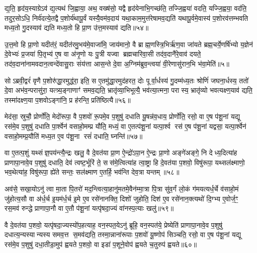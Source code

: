 द्य॒ति॒ हृद॑य॒स्याग्रेऽव॑ द्य॒त्यथ॑ जि॒ह्वाया॒ अथ॒ वख्ष॑सो॒ यद्वै हृद॑येनाभि॒गच्छ॑ति॒ तज्जि॒ह्वया॑ वदति॒ यज्जि॒ह्वया॒ वद॑ति॒ तदुर॒सोऽधि॒ निर्व॑दत्ये॒तद्वै प॒शोर्य॑थापू॒र्वं यस्यै॒वम॑व॒दाय॑ यथा॒काम॒मुत्त॑रेषामव॒द्यति॑ यथापू॒र्वमे॒वास्य॑ प॒शोरव॑त्तम्भवति मध्य॒तो गु॒दस्याव॑ द्यति मध्य॒तो हि प्रा॒ण उ॑त्त॒मस्याव॑ द्यति॥५४॥

उ॒त्त॒मो हि प्रा॒णो यदीत॑रं॒ यदीत॑रमु॒भय॑मे॒वाजा॑मि॒ जाय॑मानो॒ वै ब्राह्म॒णस्त्रि॒भिर्\mbox{}ऋ॑ण॒वा जा॑यते ब्रह्म॒चर्ये॒णर्\mbox{}षि॑भ्यो य॒ज्ञेन॑ दे॒वेभ्यः॑ प्र॒जया॑ पि॒तृभ्य॑ ए॒ष वा अ॑नृ॒णो यः पु॒त्री यज्वा ब्रह्मचारिवा॒सी तद॑व॒दानै॑रे॒वाव॑ दयते॒ तद॑व॒दाना॑नामवदान॒त्वन्दे॑वासु॒राः संय॑त्ता आस॒न्ते दे॒वा अ॒ग्निम॑ब्रुव॒न्त्वया॑ वी॒रेणासु॑रान॒भि भ॑वा॒मेति॑॥५॥

सोऽब्रवी॒द्वरं॑ वृणै प॒शोरु॑द्धा॒रमुद्ध॑रा॒ इति॒ स ए॒तमु॑द्धा॒रमुद॑हरत॒ दोः पूर्वा॒र्धस्य॑ गु॒दम्म॑ध्य॒तः श्रोणिं॑ जघना॒र्धस्य॒ ततो॑ दे॒वा अभ॑व॒न्परासु॑रा॒ यत्त्र्य॒ङ्गाणाꣳ॑ समव॒द्यति॒ भ्रातृ॑व्या॒भिभूत्यै॒ भव॑त्या॒त्मना॒ परास्य॒ भ्रातृ॑व्यो भवत्यक्ष्ण॒याव॑ द्यति॒ तस्मा॑दक्ष्ण॒या प॒शवोऽङ्गा॑नि॒ प्र ह॑रन्ति॒ प्रति॑ष्ठित्यै॥५६॥

{\anuvakamend[{ए॒तौ प॑शू॒ना समे॑धस्यै॒व तस्यावोत्त॒मस्याव॑ द्य॒तीति॒ पञ्च॑चत्वारिशच्च॥10॥}]}

मेद॑सा॒ स्रुचौ॒ प्रोर्णो॑ति॒ मेदो॑रूपा॒ वै प॒शवो॑ रू॒पमे॒व प॒शुषु॑ दधाति यू॒षन्न॑व॒धाय॒ प्रोर्णो॑ति॒ रसो॒ वा ए॒ष प॑शू॒नां यद्यू रस॑मे॒व प॒शुषु॑ दधाति पा॒र्श्वेन॑ वसाहो॒मम्प्र यौ॑ति॒ मध्यं॒ वा ए॒तत्प॑शू॒नां यत्पा॒र्श्व रस॑ ए॒ष प॑शू॒नां यद्वसा॒ यत्पा॒र्श्वेन॑ वसाहो॒मम्प्र॒यौति॑ मध्य॒त ए॒व प॑शू॒ना रसं॑ दधाति॒ घ्नन्ति॑॥५७॥

वा ए॒तत्प॒शुं यथ्संज्ञ॒पय॑न्त्यै॒न्द्रः खलु॒ वै दे॒वत॑या प्रा॒ण ऐ॒न्द्रो॑ऽपा॒न ऐ॒न्द्रः प्रा॒णो अङ्गे॑अङ्गे॒ नि देध्य॒दित्या॑ह प्राणापा॒नावे॒व प॒शुषु॑ दधाति॒ देव॑ त्वष्ट॒र्भूरि॑ ते॒ सस॑मे॒त्वित्या॑ह त्वा॒ष्ट्रा हि दे॒वत॑या प॒शवो॒ विषु॑रूपा॒ यथ्सल॑क्ष्माणो॒ भव॒थेत्या॑ह॒ विषु॑रूपा॒ ह्ये॑ते सन्तः॒ सल॑क्ष्माण ए॒तर्\mbox{}हि॒ भव॑न्ति देव॒त्रा यन्तम्॥५८॥

अव॑से॒ सखा॒योऽनु॑ त्वा मा॒ता पि॒तरो॑ मद॒न्त्वित्या॒हानु॑मतमे॒वैन॑म्मा॒त्रा पि॒त्रा सु॑व॒र्गं लो॒कं ग॑मयत्यर्ध॒र्चे व॑साहो॒मं जु॑होत्य॒सौ वा अ॑र्ध॒र्च इ॒यम॑र्ध॒र्च इ॒मे ए॒व रसे॑नानक्ति॒ दिशो॑ जुहोति॒ दिश॑ ए॒व रसे॑नान॒क्त्यथो॑ दि॒ग्भ्य ए॒वोर्ज॒ꣳ॒ रस॒मव॑ रुन्द्धे प्राणापा॒नौ वा ए॒तौ प॑शू॒नां यत्पृ॑षदा॒ज्यं वा॑नस्प॒त्याः खलु॑॥५९॥

वै दे॒वत॑या प॒शवो॒ यत्पृ॑षदा॒ज्यस्यो॑प॒हत्याह॒ वन॒स्पत॒येऽनु॑ ब्रूहि॒ वन॒स्पत॑ये॒ प्रेष्येति॑ प्राणापा॒नावे॒व प॒शुषु॑ दधात्य॒न्यस्यान्यस्य समव॒त्त स॒मव॑द्यति॒ तस्मा॒न्नाना॑रूपाः प॒शवो॑ यू॒ष्णोप॑ सिञ्चति॒ रसो॒ वा ए॒ष प॑शू॒नां यद्यू रस॑मे॒व प॒शुषु॑ दधा॒तीडा॒मुप॑ ह्वयते प॒शवो॒ वा इडा॑ प॒शूने॒वोप॑ ह्वयते च॒तुरुप॑ ह्वयते॥६०॥


